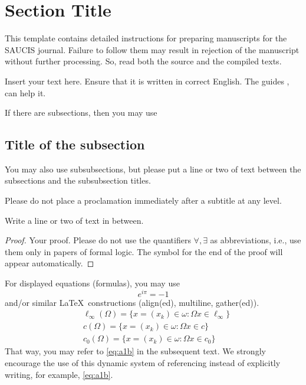 \documentclass[final, 9pt, onecolumn]{saucis}
\begin{document}
\maketitle

\justifying
\setlength{\parindent}{0pt}
\setlength{\JustifyingParindent}{0pt}
\setlength{\parskip}{.2cm}

\section{Section Title}  %
This template contains detailed instructions for preparing manuscripts for the SAUCIS journal.
Failure to follow them may result in rejection of the manuscript without further processing.
So, read both the source and the compiled texts.

Insert your text here. Ensure that it is written in correct English. 
The guides \cite{boh, sad}, \cite{gil, kar, tay} can help it.

If there are subsections, then you may use

\subsection{Title of the subsection}
You may also use subsubsections, but please put a line or two of text between the subsections and the subsubsection titles.

Please do not place a proclamation immediately after a subtitle at any level.

Write a line or two of text in between.

\begin{proof}
Your proof.
Please do not use the quantifiers $\forall,\exists$ as abbreviations,
i.e., use them only in papers of formal logic.
The symbol for the end of the proof will appear automatically.
\end{proof}

For displayed equations (formulas), you may use
\begin{equation}\label{eq:a1b}
e^{i\pi}=-1
\end{equation}
and/or similar \LaTeX\ constructions (align(ed), multiline, gather(ed)).
\begin{align*}
&\ell_{\infty}({\Omega})=\Big\{x=(x_{k})\in \omega: \Omega x \in \ell_{\infty}\}\\
&c({\Omega})=\{x=(x_{k})\in \omega: \Omega x \in c\}\\
&c_{0}({\Omega})=\{x=(x_{k})\in \omega: \Omega x \in c_{0}\}
\end{align*}
That way, you may refer to \eqref{eq:a1b} in the subsequent text.
We strongly encourage the use of this dynamic system of referencing
instead of explicitly writing, for example, \eqref{eq:a1b}.
\end{document}
